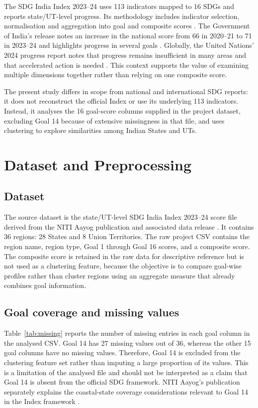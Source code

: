 \documentclass[11pt,a4paper]{article}
\begin{document}
The SDG India Index 2023--24 uses 113 indicators mapped to 16 SDGs and reports state/UT-level progress. Its methodology includes indicator selection, normalisation and aggregation into goal and composite scores \cite{niti2024}. The Government of India's release notes an increase in the national score from 66 in 2020--21 to 71 in 2023--24 and highlights progress in several goals \cite{pib2024}. Globally, the United Nations' 2024 progress report notes that progress remains insufficient in many areas and that accelerated action is needed \cite{undes2024}. This context supports the value of examining multiple dimensions together rather than relying on one composite score.

The present study differs in scope from national and international SDG reports: it does not reconstruct the official Index or use its underlying 113 indicators. Instead, it analyses the 16 goal-score columns supplied in the project dataset, excluding Goal 14 because of extensive missingness in that file, and uses clustering to explore similarities among Indian States and UTs.

\section{Dataset and Preprocessing}
\subsection{Dataset}
The source dataset is the state/UT-level SDG India Index 2023--24 score file derived from the NITI Aayog publication and associated data release \cite{niti2024}. It contains 36 regions: 28 States and 8 Union Territories. The raw project CSV contains the region name, region type, Goal 1 through Goal 16 scores, and a composite score. The composite score is retained in the raw data for descriptive reference but is not used as a clustering feature, because the objective is to compare goal-wise profiles rather than cluster regions using an aggregate measure that already combines goal information.

\subsection{Goal coverage and missing values}
Table~\ref{tab:missing} reports the number of missing entries in each goal column in the analysed CSV. Goal 14 has 27 missing values out of 36, whereas the other 15 goal columns have no missing values. Therefore, Goal 14 is excluded from the clustering feature set rather than imputing a large proportion of its values. This is a limitation of the analysed file and should not be interpreted as a claim that Goal 14 is absent from the official SDG framework. NITI Aayog's publication separately explains the coastal-state coverage considerations relevant to Goal 14 in the Index framework \cite{niti2024}.
\end{document}
